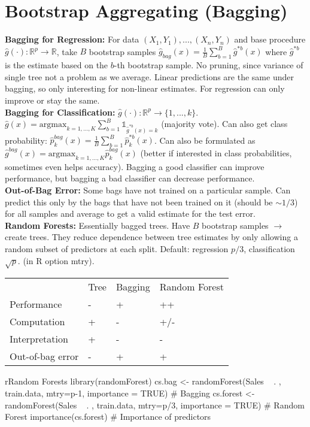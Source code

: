 \section*{Bootstrap Aggregating (Bagging)}
\textbf{Bagging for Regression:} For data $(X_1,Y_1),...,(X_n,Y_n)$ and base procedure $\hat g(\cdot): \mathbb{R}^p\to \mathbb{R}$, take $B$ bootstrap samples $\hat g_{bag}(x) = \frac 1 B \sum_{b=1}^B \hat g^{*b}(x)$ where $\hat g^{*b}$ is the estimate based on the $b$-th bootstrap sample. No pruning, since variance of single tree not a problem as we average. Linear predictions are the same under bagging, so only interesting for non-linear estimates. For regression can only improve or stay the same. \\
\textbf{Bagging for Classification:} $\hat g(\cdot): \mathbb{R}^p \to \{1, ..., k\}$. $\hat g (x) = \text{argmax}_{k=1,...,K} \sum_{b=1}^B \mathds{1}_{\hat g^{*b}(x)=k}$ (majority vote). Can also get class probability: $\hat p_k^{bag}(x) = \frac{1}{B} \sum_{b=1}^B \hat p_k^{*b}(x)$. Can also be formulated as $\hat g^{bag}(x) = \text{argmax}_{k=1,...,K} \hat p_k^{bag}(x)$ (better if interested in class probabilities, sometimes even helps accuracy). Bagging a good classifier can improve performance, but bagging a bad classifier can decrease performance. \\
\textbf{Out-of-Bag Error:}
Some bags have not trained on a particular sample. Can predict this only by the bags that have not been trained on it (should be $\sim 1/3$) for all samples and average to get a valid estimate for the test error. \\
\textbf{Random Forests:} 
Essentially bagged trees. Have $B$ bootstrap samples $\to$ create trees. They reduce dependence between tree estimates by only allowing a random subset of predictors at each split. Default: regression $p/3$, classification $\sqrt{p}$. (in R option mtry).

\begin{tabular}{llll}
                 & Tree & Bagging & Random Forest \\
Performance      & -    & +       & ++            \\
Computation      & +    & -       & +/-           \\
Interpretation   & +    & -       & -             \\
Out-of-bag error & -    & +       & +            
\end{tabular}%

\begin{codebox}{r}{Random Forests}
library(randomForest)
cs.bag <- randomForest(Sales ~ . , train.data, mtry=p-1, importance = TRUE) # Bagging
cs.forest <- randomForest(Sales ~ . , train.data, mtry=p/3, importance = TRUE) # Random Forest
importance(cs.forest) # Importance of predictors
\end{codebox}